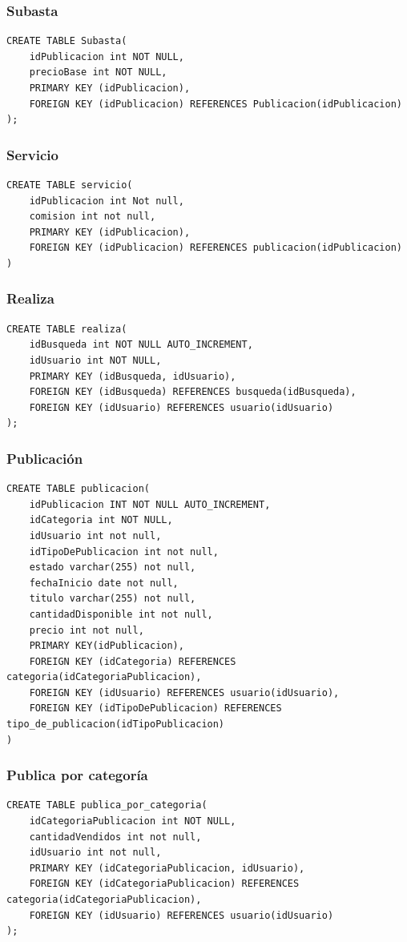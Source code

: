 \documentclass[a4paper, 10pt, twoside]{article}
\begin{document}
\subsubsection{Subasta}
\begin{verbatim}
CREATE TABLE Subasta(
	idPublicacion int NOT NULL,
	precioBase int NOT NULL, 
	PRIMARY KEY	(idPublicacion),
	FOREIGN KEY (idPublicacion) REFERENCES Publicacion(idPublicacion)
);
\end{verbatim}
\newpage
\subsubsection{Servicio}
\begin{verbatim}
CREATE TABLE servicio(
	idPublicacion int Not null,
    comision int not null,
    PRIMARY KEY (idPublicacion),
    FOREIGN KEY (idPublicacion) REFERENCES publicacion(idPublicacion)
)
\end{verbatim}
\subsubsection{Realiza}
\begin{verbatim}
CREATE TABLE realiza(
	idBusqueda int NOT NULL AUTO_INCREMENT,
	idUsuario int NOT NULL, 
	PRIMARY KEY	(idBusqueda, idUsuario),
    FOREIGN KEY (idBusqueda) REFERENCES busqueda(idBusqueda),
    FOREIGN KEY (idUsuario) REFERENCES usuario(idUsuario)
);
\end{verbatim}
\subsubsection{Publicaci\'on}
\begin{verbatim}
CREATE TABLE publicacion(
	idPublicacion INT NOT NULL AUTO_INCREMENT,
	idCategoria int NOT NULL,
    idUsuario int not null,
    idTipoDePublicacion int not null,
    estado varchar(255) not null,
    fechaInicio date not null,
    titulo varchar(255) not null,
    cantidadDisponible int not null,
    precio int not null,
    PRIMARY KEY(idPublicacion),
    FOREIGN KEY (idCategoria) REFERENCES categoria(idCategoriaPublicacion),
    FOREIGN KEY (idUsuario) REFERENCES usuario(idUsuario),
    FOREIGN KEY (idTipoDePublicacion) REFERENCES tipo_de_publicacion(idTipoPublicacion)
)
\end{verbatim}
\subsubsection{Publica por categor\'ia}
\begin{verbatim}
CREATE TABLE publica_por_categoria(
	idCategoriaPublicacion int NOT NULL,
	cantidadVendidos int not null,
	idUsuario int not null,
    PRIMARY KEY (idCategoriaPublicacion, idUsuario),
    FOREIGN KEY (idCategoriaPublicacion) REFERENCES categoria(idCategoriaPublicacion),
    FOREIGN KEY (idUsuario) REFERENCES usuario(idUsuario)
);

\end{verbatim}
\newpage
\end{document}
